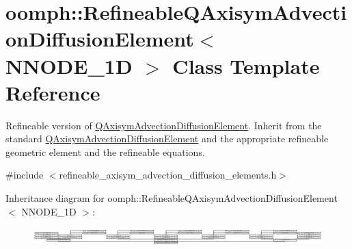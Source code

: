 \hypertarget{classoomph_1_1RefineableQAxisymAdvectionDiffusionElement}{}\section{oomph\+:\+:Refineable\+Q\+Axisym\+Advection\+Diffusion\+Element$<$ N\+N\+O\+D\+E\+\_\+1D $>$ Class Template Reference}
\label{classoomph_1_1RefineableQAxisymAdvectionDiffusionElement}


Refineable version of \hyperlink{classoomph_1_1QAxisymAdvectionDiffusionElement}{Q\+Axisym\+Advection\+Diffusion\+Element}. Inherit from the standard \hyperlink{classoomph_1_1QAxisymAdvectionDiffusionElement}{Q\+Axisym\+Advection\+Diffusion\+Element} and the appropriate refineable geometric element and the refineable equations.  




{\ttfamily \#include $<$refineable\+\_\+axisym\+\_\+advection\+\_\+diffusion\+\_\+elements.\+h$>$}

Inheritance diagram for oomph\+:\+:Refineable\+Q\+Axisym\+Advection\+Diffusion\+Element$<$ N\+N\+O\+D\+E\+\_\+1D $>$\+:\begin{figure}[H]
\begin{center}
\leavevmode
\includegraphics[height=0.673077cm]{classoomph_1_1RefineableQAxisymAdvectionDiffusionElement}
\end{center}
\end{figure}
